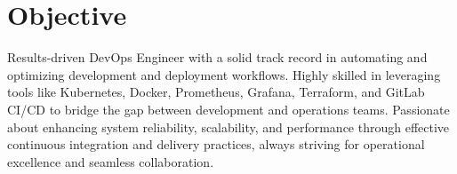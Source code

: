 \documentclass[../main.tex]{subfiles}
\begin{document}
  \section{Objective}
  \begin{category}
    \citembullet  
    Results-driven DevOps Engineer with a solid track record in automating and optimizing development and deployment workflows.
    Highly skilled in leveraging tools like Kubernetes, Docker, Prometheus, Grafana, Terraform, and GitLab CI/CD to bridge the gap between development and operations teams.
    Passionate about enhancing system reliability, scalability, and performance through effective continuous integration and delivery practices, always striving for operational excellence and seamless collaboration.
  \end{category}
\end{document}
